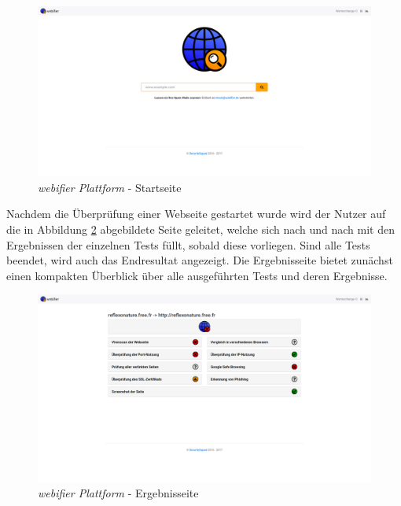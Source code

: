\begin{figure}[H]
  \centering
  \includegraphics[width=\textwidth]{images/platform/screenshot-start}
  \caption[\textit{webifier Plattform} - Startseite]{\textit{webifier Plattform} -
  Startseite\protect\footnotemark}
  \label{fig:platform-start}
\end{figure}

Nachdem die Überprüfung einer Webseite gestartet wurde wird der Nutzer auf die in Abbildung \ref{fig:platform-result} abgebildete Seite geleitet, welche sich nach und nach mit den Ergebnissen der einzelnen Tests füllt, sobald diese vorliegen. Sind alle Tests beendet, wird auch das Endresultat angezeigt. Die Ergebnisseite bietet zunächst einen kompakten Überblick über alle ausgeführten Tests und deren Ergebnisse.

\begin{figure}[H]
  \centering
  \includegraphics[width=\textwidth]{images/platform/screenshot-reflexonature}
  \caption[\textit{webifier Plattform} - Ergebnisseite]{\textit{webifier Plattform} -
  Ergebnisseite\protect\footnotemark}
  \label{fig:platform-result}
\end{figure}

